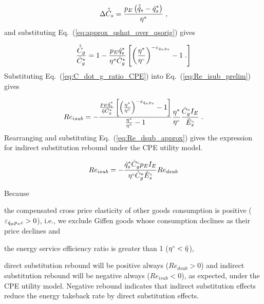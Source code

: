 \begin{equation}
  \Delta \hat{\dot{C}}_s = \frac{p_E \left( \hat{\dot{q}}_s - {\dot{q}}^*_s \right)}{{\eta}^*} \; ,
\end{equation}
%
and
substituting Eq.~(\ref{eq:approx_qshat_over_qsorig}) gives

\begin{equation} \label{eq:C_dot_g_ratio_CPE}
  \frac{\hat{\dot{C}}_g}{{\dot{C}}^*_g} = 1 - \frac{p_E {\dot{q}}^*_s}{{\eta}^*  {\dot{C}}^*_g} \left[ \left( \frac{{\eta}^*}{{}{\eta}^{\scriptscriptstyle \circ}} \right)^{-\varepsilon_{\dot{q}_s\!,p_s}} - 1 \; . \right]
\end{equation}
%
Substituting Eq.~(\ref{eq:C_dot_g_ratio_CPE})
into Eq.~(\ref{eq:Re_isub_prelim}) gives

\begin{equation}
  Re_{isub} = - \frac{\frac{p_E {\dot{q}}^*_s}{\tilde{\eta} {\dot{C}}^*_g}
                   \left[ \left( \frac{{\eta}^*}{{}{\eta}^{\scriptscriptstyle \circ}} \right)^{-\varepsilon_{\dot{q}_s\!,p_s}} - 1   \right] }
                {\frac{{\eta}^*}{{}{\eta}^{\scriptscriptstyle \circ}} - 1}
                \frac{{\eta}^*}{{}{\eta}^{\scriptscriptstyle \circ}}
                \frac{{}{\dot{C}}^{\scriptscriptstyle \circ}_g I_E}{{}{\dot{E}}^{\scriptscriptstyle \circ}_s} \; .
\end{equation}
%
Rearranging and substituting Eq.~(\ref{eq:Re_dsub_approx}) gives
the expression for indirect substitution rebound under the
CPE utility model.

\begin{equation} \label{eq:Re_isub_cpe}
  Re_{isub} = - \frac{{\dot{q}}^*_s {}{\dot{C}}^{\scriptscriptstyle \circ}_g p_E I_E}{{}{\eta}^{\scriptscriptstyle \circ} {\dot{C}}^*_g {}{\dot{E}}^{\scriptscriptstyle \circ}_s} Re_{dsub}
\end{equation}

Because %
\begin{enumerate*}[label={(\roman*)}]

  \item the compensated cross price elasticity
        of other goods consumption is positive ($\varepsilon_{\dot{q}_g\!,p_s\!,c} > 0$),
        i.e., we exclude Giffen goods
        \citep{Spiegel:1994aa}
        whose consumption declines
        as their price declines and

  \item the energy service efficiency ratio is greater than 1
        (${}{\eta}^{\scriptscriptstyle \circ} < \tilde{\eta}$),

\end{enumerate*}
%
direct substitution rebound will be positive always
($Re_{dsub} > 0$) and
indirect substitution rebound will be negative always
($Re_{isub} < 0$),
as expected, under the CPE utility model.
Negative rebound indicates that indirect substitution effects
reduce the energy takeback rate by direct substitution effects.


